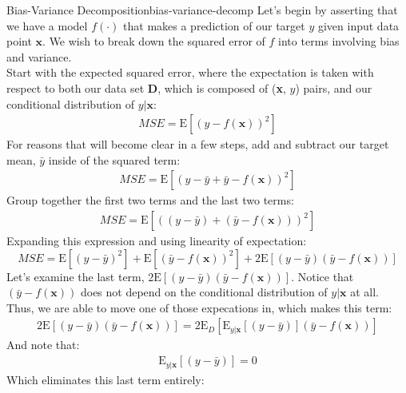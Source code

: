 \begin{derivation}{Bias-Variance Decomposition}{bias-variance-decomp}
    Let's begin by asserting that we have a model $f(\cdot)$ that makes a prediction of our target $y$ given input data point $\textbf{x}$. We wish to break down the squared error of $f$ into terms involving bias and variance. \\

    Start with the expected squared error, where the expectation is taken with respect to both our data set $\textbf{D}$, which is composed of (\textbf{x}, $y$) pairs, and our conditional distribution of $y | \textbf{x}$:
    \begin{align*}
        \textit{MSE} = \mathrm{E}[(y - f(\textbf{x}))^{2}]
    \end{align*}
    For reasons that will become clear in a few steps, add and subtract our target mean, $\bar{y}$ inside of the squared term:
    \begin{align*}
        \textit{MSE} = \mathrm{E}[(y - \bar{y} + \bar{y} - f(\textbf{x}))^{2}]
    \end{align*}
    Group together the first two terms and the last two terms:
    \begin{align*}
        \textit{MSE} = \mathrm{E}[((y - \bar{y}) + (\bar{y} - f(\textbf{x})))^{2}]
    \end{align*}
    Expanding this expression and using linearity of expectation:
    \begin{equation} \label{bias-variance-intermediate-1}
        \textit{MSE} = \mathrm{E}[(y - \bar{y})^{2}] + \mathrm{E}[(\bar{y} - f(\textbf{x}))^{2}] + 2\mathrm{E}[(y - \bar{y})(\bar{y} - f(\textbf{x}))]
    \end{equation}
    Let's examine the last term, $2\mathrm{E}[(y - \bar{y})(\bar{y} - f(\textbf{x}))]$. Notice that $(\bar{y} - f(\textbf{x}))$ does not depend on the conditional distribution of $y|\textbf{x}$ at all. Thus, we are able to move one of those expecations in, which makes this term:
    \begin{align*}
        2\mathrm{E}[(y - \bar{y})(\bar{y} - f(\textbf{x}))] = 2\mathrm{E}_{D}[\mathrm{E}_{y|\textbf{x}}[(y - \bar{y})](\bar{y} - f(\textbf{x}))]
    \end{align*}
    And note that:
    \begin{align*}
        \mathrm{E}_{y|\textbf{x}}[(y - \bar{y})] = 0
    \end{align*}
    Which eliminates this last term entirely:
    \begin{align*}

\end{align*}
\end{derivation}
